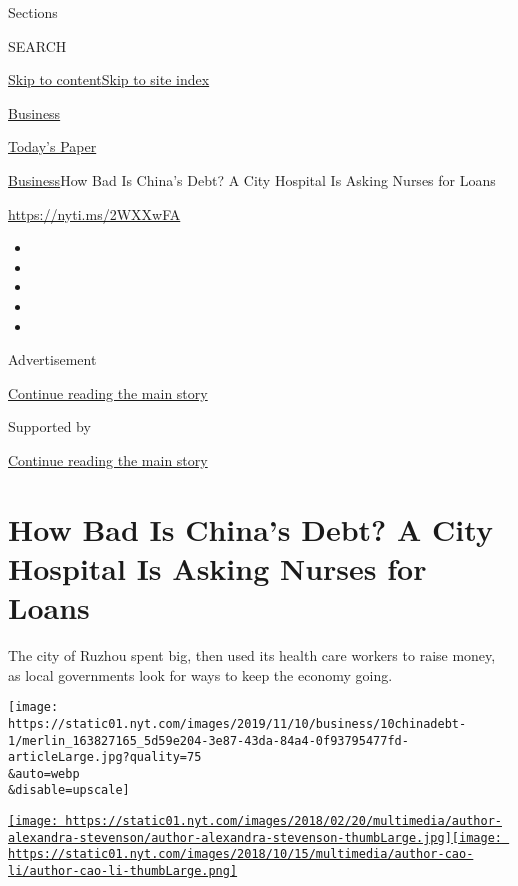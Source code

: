 Sections

SEARCH

\protect\hyperlink{site-content}{Skip to
content}\protect\hyperlink{site-index}{Skip to site index}

\href{https://www.nytimes.com/section/business}{Business}

\href{https://myaccount.nytimes.com/auth/login?response_type=cookie\&client_id=vi}{}

\href{https://www.nytimes.com/section/todayspaper}{Today's Paper}

\href{/section/business}{Business}\textbar{}How Bad Is China's Debt? A
City Hospital Is Asking Nurses for Loans

\url{https://nyti.ms/2WXXwFA}

\begin{itemize}
\item
\item
\item
\item
\item
\end{itemize}

Advertisement

\protect\hyperlink{after-top}{Continue reading the main story}

Supported by

\protect\hyperlink{after-sponsor}{Continue reading the main story}

\hypertarget{how-bad-is-chinas-debt-a-city-hospital-is-asking-nurses-for-loans}{%
\section{How Bad Is China's Debt? A City Hospital Is Asking Nurses for
Loans}\label{how-bad-is-chinas-debt-a-city-hospital-is-asking-nurses-for-loans}}

The city of Ruzhou spent big, then used its health care workers to raise
money, as local governments look for ways to keep the economy going.

\texttt{[image: https://static01.nyt.com/images/2019/11/10/business/10chinadebt-1/merlin\_163827165\_5d59e204-3e87-43da-84a4-0f93795477fd-articleLarge.jpg?quality=75\\\&auto=webp\\\&disable=upscale]}

\href{https://www.nytimes.com/by/alexandra-stevenson}{\texttt{[image: https://static01.nyt.com/images/2018/02/20/multimedia/author-alexandra-stevenson/author-alexandra-stevenson-thumbLarge.jpg]}}\href{https://www.nytimes.com/by/cao-li}{\texttt{[image: https://static01.nyt.com/images/2018/10/15/multimedia/author-cao-li/author-cao-li-thumbLarge.png]}}

